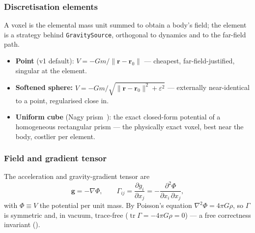 \documentclass[11pt,a4paper]{article}
\theoremstyle{reqstyle}
\newcommand{\rv}{\mathbf{r}}
\newcommand{\grad}{\nabla}
\DeclareMathOperator{\tr}{tr}
\begin{document}
\subsubsection{Discretisation elements}
A voxel is the elemental mass unit summed to obtain a body's field; the element is a
strategy behind \texttt{GravitySource}, orthogonal to dynamics and to the far-field path.
\begin{itemize}[leftmargin=*,nosep]
\item \textbf{Point} (v1 default): $V = -Gm/\lVert\rv-\rv_0\rVert$ --- cheapest,
far-field-justified, singular at the element.
\item \textbf{Softened sphere:} $V = -Gm/\sqrt{\lVert\rv-\rv_0\rVert^2 + \varepsilon^2}$ ---
externally near-identical to a point, regularised close in.
\item \textbf{Uniform cube} (Nagy prism~\cite{nagy2000}): the exact closed-form potential of
a homogeneous rectangular prism --- the physically exact voxel, best near the body, costlier
per element.
\end{itemize}

\subsubsection{Field and gradient tensor}
The acceleration and gravity-gradient tensor are
\begin{equation}
\mathbf g = -\grad\Phi,
\qquad
\Gamma_{ij} = \frac{\partial g_i}{\partial x_j} = -\frac{\partial^2\Phi}{\partial x_i\,\partial x_j},
\end{equation}
with $\Phi \equiv V$ the potential per unit mass. By Poisson's equation
$\grad^2\Phi = 4\pi G\rho$, so $\Gamma$ is symmetric and, in vacuum, trace-free
($\tr\Gamma = -4\pi G\rho = 0$) --- a free correctness invariant ().
\end{document}
